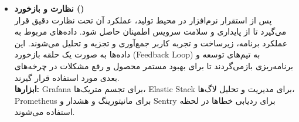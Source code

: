 \begin{itemize}
    \item \textbf{نظارت و بازخورد ()} \\
    پس از استقرار نرم‌افزار در محیط تولید، عملکرد آن تحت نظارت دقیق قرار می‌گیرد تا از پایداری و سلامت سرویس اطمینان حاصل شود. داده‌های مربوط به عملکرد برنامه، زیرساخت و تجربه کاربر جمع‌آوری و تجزیه و تحلیل می‌شوند. این داده‌ها به صورت یک حلقه بازخورد (Feedback Loop) به تیم‌های توسعه و برنامه‌ریزی بازمی‌گردند تا برای بهبود مستمر محصول و رفع مشکلات در چرخه‌های بعدی مورد استفاده قرار گیرند. \\
    \textbf{ابزارها:} Grafana برای تجسم متریک‌ها، Elastic Stack برای مدیریت و تحلیل لاگ‌ها، Prometheus برای مانیتورینگ و هشدار و Sentry برای ردیابی خطاها در لحظه استفاده می‌شوند.
\end{itemize}
